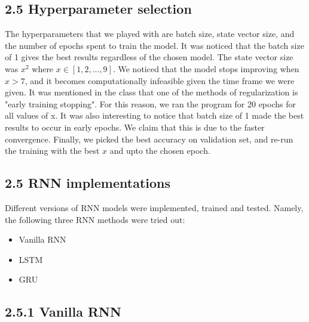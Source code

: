 \subsection*{2.5 Hyperparameter selection}
The hyperparameters that we played with are batch size, state vector size, and the number of epochs spent to train the model. It was noticed that the batch size of 1 gives the best results regardless of the chosen model. The state vector size was \(x^{2}\) where \(x \in [1,2,...,9]\). We noticed that the model stops improving when \(x>7\), and it becomes computationally infeasible given the time frame we were given. It was mentioned in the class that one of the methods of regularization is "early training stopping". For this reason, we ran the program for 20 epochs for all values of x. It was also interesting to notice that batch size of 1 made the best results to occur in early epochs. We claim that this is due to the faster convergence. Finally, we picked the best accuracy on validation set, and re-run the training with the best \(x\) and upto the chosen epoch. 

\subsection*{2.5 RNN implementations}
Different versions of RNN models were implemented, trained and tested. Namely, the following three RNN methods were tried out:
\begin{itemize}
	\item Vanilla RNN
	\item LSTM
	\item GRU
\end{itemize}

\subsection*{2.5.1 Vanilla RNN}


